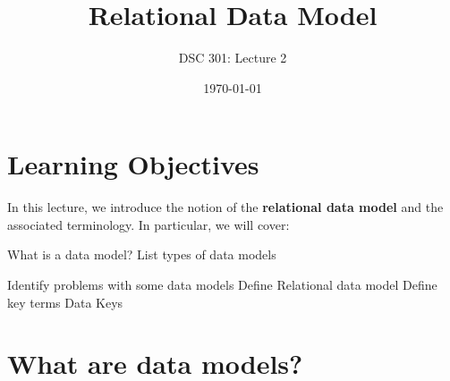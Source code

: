 \documentclass{article}
\newtheorem{definition}{Definition}
\begin{document}
\title{Relational Data Model}
\author{DSC 301: Lecture 2}
\date{\today}
\maketitle



\begin{outline}[enumerate]

\end{outline}
\begin{outline}
        
\end{outline}




\section*{Learning Objectives}
In this lecture, we introduce the notion of the \textbf{relational data model} and the associated terminology.  In particular, we will cover:  
\begin{outline}
        \1 What is a data model?
        \1 List types of data models

 \1 Identify problems with some data models           
        \1 Define Relational data model
        \1 Define key terms
   \1 Data Keys
                
\end{outline}










\section{What are data models?}
\end{document}
